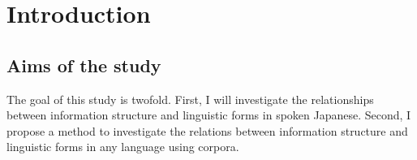 \chapter{Introduction}\label{Introduction}







\section{Aims of the study}\label{IntroAims}

The goal of this study is twofold.
First,
I will investigate the relationships between information structure and linguistic forms in spoken Japanese.
Second,
I propose a method to investigate the relations between information structure and linguistic forms in any language using corpora.

